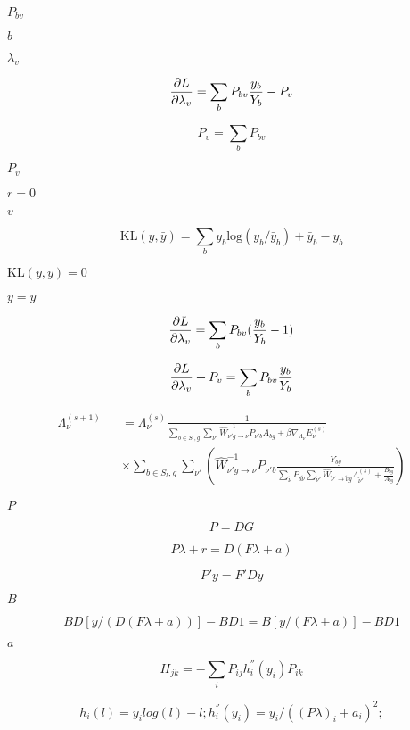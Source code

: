\documentclass{article}
\begin{document}
$P_{bv}$
\pagebreak

$b$
\pagebreak

$\lambda_v$
\pagebreak

\[ {\partial L \over \partial \lambda_v} = \sum_b P_{bv} {y_b \over Y_b} - P_v \]
\pagebreak

\[ P_v = \sum_b P_{bv} \]
\pagebreak

$P_v$
\pagebreak

$r=0$
\pagebreak

$v$
\pagebreak

\[ \mathrm{KL}(y,\bar y) = \sum_b y_b \mathrm{log}(y_b/\bar y_b) + \bar y_b - y_b \]
\pagebreak

$\mathrm{KL}(y,\bar y)=0$
\pagebreak

$y=\bar y$
\pagebreak

\[ {\partial L \over \partial \lambda_v} = \sum_b P_{bv} ({y_b \over Y_b} - 1) \]
\pagebreak

\[ {\partial L \over \partial \lambda_v} + P_v = \sum_b P_{bv} {y_b \over Y_b} \]
\pagebreak

\[ \begin{array}{lcl} \Lambda_{\nu}^{(s+1)}&&=\Lambda_{\nu}^{(s)} \frac{1}{ \sum\limits_{b\in S_{l}, g} \sum\limits_{\nu'} \hat{W}^{-1} _{\nu'g\rightarrow \nu}P_{\nu' b}A_{bg}+\beta \nabla_{\Lambda_{\nu}} E_{\nu}^{(s)}}\\ &&\times \sum\limits_{b\in S_{l}, g} \sum\limits_{\nu'}\left(\hat{W}^{-1} _{\nu'g\rightarrow \nu}P_{\nu' b}\frac{Y_{bg}}{\sum\limits_{\tilde{\nu}}P_{b\tilde{\nu}}\sum\limits_{\tilde{\nu}'}\hat{W} _{\tilde{\nu}'\rightarrow \tilde{\nu}g}\Lambda_{\tilde{\nu}'}^{(s)}+\frac{B_{bg}}{A_{bg}}}\right) \end{array} \]
\pagebreak

$P$
\pagebreak

\[ P = D G \]
\pagebreak

\[ P \lambda + r = D ( F \lambda + a ) \]
\pagebreak

\[ P' y = F' D y \]
\pagebreak

$B$
\pagebreak

\[ B D \left[ y / \left( D (F \lambda + a) \right) \right] - B D 1 = B \left[ y / \left(F \lambda + a \right) \right] - B D 1 \]
\pagebreak

$a$
\pagebreak

\[ H_{jk} = - \sum_i P_{ij} h_i^{''}(y_i) P_{ik} \]
\pagebreak

\[ h_i(l) = y_i log (l) - l; h_i^{''}(y_i) = y_i / ((P \lambda)_i + a_i)^2; \]
\pagebreak
\end{document}
